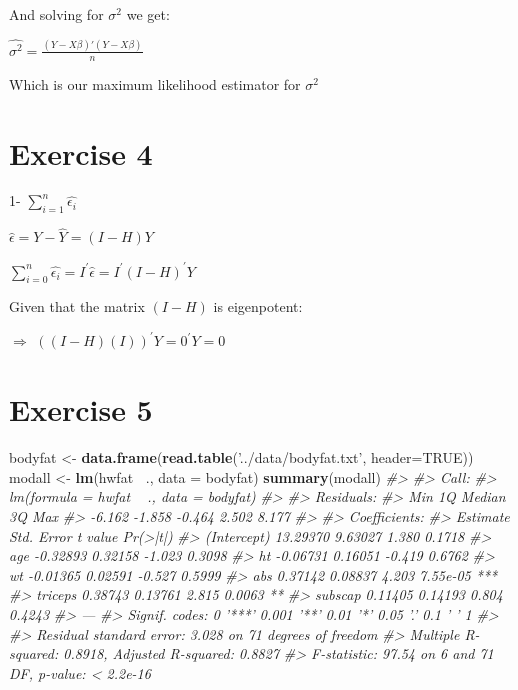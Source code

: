 \documentclass[]{article}
\newenvironment{Shaded}{\begin{snugshade}}{\end{snugshade}}
\newcommand{\CommentTok}[1]{\textcolor[rgb]{0.56,0.35,0.01}{\textit{#1}}}
\newcommand{\DataTypeTok}[1]{\textcolor[rgb]{0.13,0.29,0.53}{#1}}
\newcommand{\KeywordTok}[1]{\textcolor[rgb]{0.13,0.29,0.53}{\textbf{#1}}}
\newcommand{\NormalTok}[1]{#1}
\newcommand{\OperatorTok}[1]{\textcolor[rgb]{0.81,0.36,0.00}{\textbf{#1}}}
\newcommand{\OtherTok}[1]{\textcolor[rgb]{0.56,0.35,0.01}{#1}}
\newcommand{\StringTok}[1]{\textcolor[rgb]{0.31,0.60,0.02}{#1}}
\begin{document}
And solving for \(\sigma^{2}\) we get:

\(\hat{\sigma^{2}} = \frac{(Y - X \beta) \prime (Y - X \beta)}{n}\)

Which is our maximum likelihood estimator for \(\sigma^2\)

\newpage

\hypertarget{exercise-4}{%
\section{Exercise 4}\label{exercise-4}}

1- \(\sum_{i=1}^n \hat{\epsilon_i}\)

\(\hat{\epsilon} = Y - \hat{Y} = (I-H)Y\)

\(\sum_{i=0}^n \hat{\epsilon_i} = I^{\prime} \hat{\epsilon} = I^{\prime} (I - H)^{\prime} Y\)

Given that the matrix \((I - H)\) is eigenpotent:

\(\Rightarrow\) \(((I-H)(I))^{\prime} Y = 0^{\prime} Y = 0\)

\newpage

\hypertarget{exercise-5}{%
\section{Exercise 5}\label{exercise-5}}

\begin{Shaded}
\begin{Highlighting}[]
\NormalTok{bodyfat <-}\StringTok{ }\KeywordTok{data.frame}\NormalTok{(}\KeywordTok{read.table}\NormalTok{(}\StringTok{'../data/bodyfat.txt'}\NormalTok{, }\DataTypeTok{header=}\OtherTok{TRUE}\NormalTok{))}
\NormalTok{modall <-}\StringTok{ }\KeywordTok{lm}\NormalTok{(hwfat }\OperatorTok{~}\NormalTok{., }\DataTypeTok{data =}\NormalTok{ bodyfat)}
\KeywordTok{summary}\NormalTok{(modall)}
\CommentTok{#> }
\CommentTok{#> Call:}
\CommentTok{#> lm(formula = hwfat ~ ., data = bodyfat)}
\CommentTok{#> }
\CommentTok{#> Residuals:}
\CommentTok{#>    Min     1Q Median     3Q    Max }
\CommentTok{#> -6.162 -1.858 -0.464  2.502  8.177 }
\CommentTok{#> }
\CommentTok{#> Coefficients:}
\CommentTok{#>             Estimate Std. Error t value Pr(>|t|)    }
\CommentTok{#> (Intercept) 13.29370    9.63027   1.380   0.1718    }
\CommentTok{#> age         -0.32893    0.32158  -1.023   0.3098    }
\CommentTok{#> ht          -0.06731    0.16051  -0.419   0.6762    }
\CommentTok{#> wt          -0.01365    0.02591  -0.527   0.5999    }
\CommentTok{#> abs          0.37142    0.08837   4.203 7.55e-05 ***}
\CommentTok{#> triceps      0.38743    0.13761   2.815   0.0063 ** }
\CommentTok{#> subscap      0.11405    0.14193   0.804   0.4243    }
\CommentTok{#> ---}
\CommentTok{#> Signif. codes:  0 '***' 0.001 '**' 0.01 '*' 0.05 '.' 0.1 ' ' 1}
\CommentTok{#> }
\CommentTok{#> Residual standard error: 3.028 on 71 degrees of freedom}
\CommentTok{#> Multiple R-squared:  0.8918, Adjusted R-squared:  0.8827 }
\CommentTok{#> F-statistic: 97.54 on 6 and 71 DF,  p-value: < 2.2e-16}
\end{Highlighting}
\end{Shaded}
\end{document}
